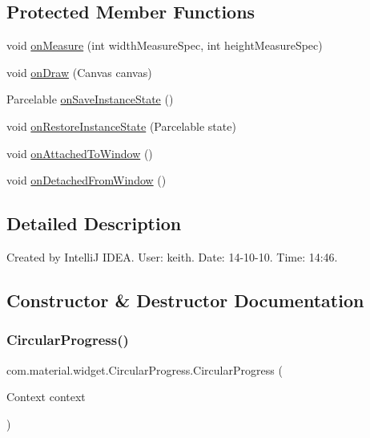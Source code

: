 \subsection*{Protected Member Functions}
\begin{DoxyCompactItemize}
\item 
void \hyperlink{classcom_1_1material_1_1widget_1_1_circular_progress_aadc1faac2bb02bd865a5a89b56b43729}{on\+Measure} (int width\+Measure\+Spec, int height\+Measure\+Spec)
\item 
void \hyperlink{classcom_1_1material_1_1widget_1_1_circular_progress_a80fce68074c967b000fd7e451e5336b4}{on\+Draw} (Canvas canvas)
\item 
Parcelable \hyperlink{classcom_1_1material_1_1widget_1_1_circular_progress_a54dfeb7f9758879e45ee766537a83300}{on\+Save\+Instance\+State} ()
\item 
void \hyperlink{classcom_1_1material_1_1widget_1_1_circular_progress_a6a80f233718569a2ee4b0c0174dac5cc}{on\+Restore\+Instance\+State} (Parcelable state)
\item 
void \hyperlink{classcom_1_1material_1_1widget_1_1_circular_progress_abc51fa766f8ebb054fc2b75f24e05806}{on\+Attached\+To\+Window} ()
\item 
void \hyperlink{classcom_1_1material_1_1widget_1_1_circular_progress_a5093bf6fb1d50164aaf54358b16790a2}{on\+Detached\+From\+Window} ()
\end{DoxyCompactItemize}


\subsection{Detailed Description}
Created by IntelliJ I\+D\+EA. User\+: keith. Date\+: 14-\/10-\/10. Time\+: 14\+:46. 

\subsection{Constructor \& Destructor Documentation}
\mbox{\label{classcom_1_1material_1_1widget_1_1_circular_progress_aaa170773108fc1723c2d51e2c032b362}} 
\subsubsection{\texorpdfstring{Circular\+Progress()}{CircularProgress()}\hspace{0.1cm}{\footnotesize\ttfamily [1/3]}}
{\footnotesize\ttfamily com.\+material.\+widget.\+Circular\+Progress.\+Circular\+Progress (\begin{DoxyParamCaption}\item[{Context}]{context }\end{DoxyParamCaption})}


